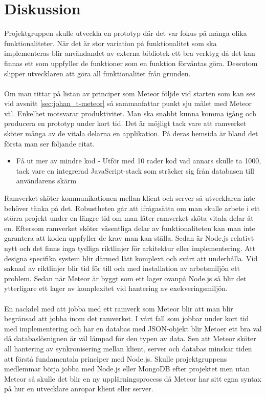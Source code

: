 \section{Diskussion}
\label{sec:johan_t-diskussion}
Projektgruppen skulle utveckla en prototyp där det var fokus på många olika funktionaliteter. När det är stor variation på funktionalitet som ska implementeras blir användandet av externa bibliotek ett bra verktyg då det kan finnas ett som uppfyller de funktioner som en funktion förväntas göra. Dessutom slipper utvecklaren att göra all funktionalitet från grunden.
\\ \\
Om man tittar på listan av principer som Meteor följde vid starten som kan ses vid avsnitt \ref{sec:johan_t-meteor} så sammanfattar punkt sju målet med Meteor väl. Enkelhet motsvarar produktivitet. Man ska snabbt kunna komma igång och producera en prototyp under kort tid. Det är möjligt tack vare att ramverket sköter många av de vitala delarna en applikation. På deras hemsida är bland det första man ser följande citat.\cite{website:meteor}
\begin{itemize}
\item Få ut mer av mindre kod - Utför med 10 rader kod vad annars skulle ta 1000, tack vare en integrerad JavaScript-stack som sträcker sig från databasen till användarens skärm
\end{itemize}
Ramverket sköter kommunikationen mellan klient och server så utvecklaren inte behöver tänka på det. Robustheten går att ifrågasätta om man skulle arbete i ett störra projekt under en längre tid om man låter ramverket sköta vitala delar åt en. Eftersom ramverket sköter väsentliga delar av funktionaliteten kan man inte garantera att koden uppfyller de krav man kan ställa. Sedan är Node.js relativt nytt och det finns inga tydliga riktlinjer för arkitektur eller implementering.\cite{review_node} Att designa specifika system blir därmed lätt komplext och svårt att underhålla. Vid saknad av riktlinjer blir tid för till och med installation av arbetsmiljön ett problem. Sedan när Meteor är byggt som ett lager ovanpå Node.js så blir det ytterligare ett lager av komplexitet vid hantering av exekveringsmiljön.
\\ \\
En nackdel med att jobba med ett ramverk som Meteor blir att man blir begränsad att jobba inom det ramverket. I vårt fall som jobbar under kort tid med implementering och har en databas med JSON-objekt blir Metoer ett bra val då databaslösnignen är väl lämpad för den typen av data. Sen att Meteor sköter all hantering av synkronisering mellan klient, server och databas minskar tiden att förstå fundamentala principer med Node.js. Skulle projektgruppens medlemmar börja jobba med Node.js eller MongoDB efter projektet men utan Meteor så skulle det blir en ny upplärningsprocess då Meteor har sitt egna syntax på hur en utvecklare anropar klient eller server.

